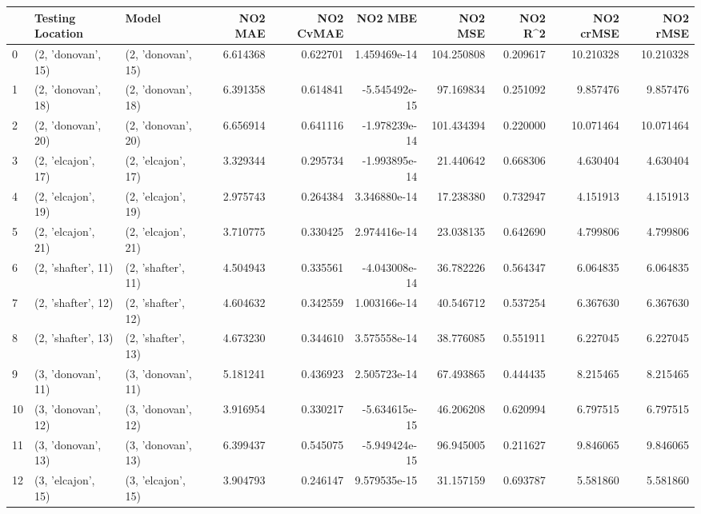 \begin{tabular}{lllrrrrrrr}
\toprule
{} &    Testing Location &               Model &   NO2 MAE &  NO2 CvMAE &       NO2 MBE &     NO2 MSE &   NO2 R\textasciicircum2 &  NO2 crMSE &   NO2 rMSE \\
\midrule
0  &  (2, 'donovan', 15) &  (2, 'donovan', 15) &  6.614368 &   0.622701 &  1.459469e-14 &  104.250808 &  0.209617 &  10.210328 &  10.210328 \\
1  &  (2, 'donovan', 18) &  (2, 'donovan', 18) &  6.391358 &   0.614841 & -5.545492e-15 &   97.169834 &  0.251092 &   9.857476 &   9.857476 \\
2  &  (2, 'donovan', 20) &  (2, 'donovan', 20) &  6.656914 &   0.641116 & -1.978239e-14 &  101.434394 &  0.220000 &  10.071464 &  10.071464 \\
3  &  (2, 'elcajon', 17) &  (2, 'elcajon', 17) &  3.329344 &   0.295734 & -1.993895e-14 &   21.440642 &  0.668306 &   4.630404 &   4.630404 \\
4  &  (2, 'elcajon', 19) &  (2, 'elcajon', 19) &  2.975743 &   0.264384 &  3.346880e-14 &   17.238380 &  0.732947 &   4.151913 &   4.151913 \\
5  &  (2, 'elcajon', 21) &  (2, 'elcajon', 21) &  3.710775 &   0.330425 &  2.974416e-14 &   23.038135 &  0.642690 &   4.799806 &   4.799806 \\
6  &  (2, 'shafter', 11) &  (2, 'shafter', 11) &  4.504943 &   0.335561 & -4.043008e-14 &   36.782226 &  0.564347 &   6.064835 &   6.064835 \\
7  &  (2, 'shafter', 12) &  (2, 'shafter', 12) &  4.604632 &   0.342559 &  1.003166e-14 &   40.546712 &  0.537254 &   6.367630 &   6.367630 \\
8  &  (2, 'shafter', 13) &  (2, 'shafter', 13) &  4.673230 &   0.344610 &  3.575558e-14 &   38.776085 &  0.551911 &   6.227045 &   6.227045 \\
9  &  (3, 'donovan', 11) &  (3, 'donovan', 11) &  5.181241 &   0.436923 &  2.505723e-14 &   67.493865 &  0.444435 &   8.215465 &   8.215465 \\
10 &  (3, 'donovan', 12) &  (3, 'donovan', 12) &  3.916954 &   0.330217 & -5.634615e-15 &   46.206208 &  0.620994 &   6.797515 &   6.797515 \\
11 &  (3, 'donovan', 13) &  (3, 'donovan', 13) &  6.399437 &   0.545075 & -5.949424e-15 &   96.945005 &  0.211627 &   9.846065 &   9.846065 \\
12 &  (3, 'elcajon', 15) &  (3, 'elcajon', 15) &  3.904793 &   0.246147 &  9.579535e-15 &   31.157159 &  0.693787 &   5.581860 &   5.581860 \\

\end{tabular}
